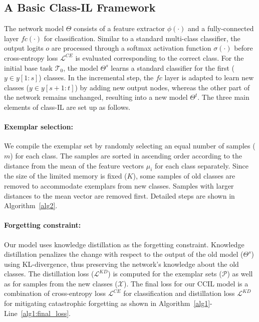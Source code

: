 \documentclass[final]{cvpr}
\begin{document}
\subsection{A Basic Class-IL Framework}
The network model $\Theta$ consists of a feature extractor $\phi(\cdot)$ and a fully-connected layer $fc(\cdot)$ for classification. Similar to a standard multi-class classifier, the output logits $o$ are processed through a softmax activation function $\sigma(\cdot)$ before cross-entropy loss $\mathcal{L}^{CE}$ is evaluated corresponding to the correct class.
For the initial base task $\mathcal{T}_0$, the model $\Theta^s$ learns a standard classifier for the first ($y \in y[1:s]$) classes. 
In the incremental step, the $fc$ layer is adapted to learn new classes ($y \in y[s+1:t]$) by adding new output nodes, whereas the other part of the network remains unchanged, resulting into a new model $\Theta^t$. The three main elements of class-IL are set up as follows. 

\paragraph{Exemplar selection:}
We compile the exemplar set by randomly selecting an equal number of samples ($m$) for each class. The samples are sorted in ascending order according to the distance from the mean of the feature vectors $\mu_i$ for each class separately.
Since the size of the limited memory is fixed ($K$), some samples of old classes are removed to accommodate exemplars from new classes. Samples with larger distances to the mean vector are removed first. Detailed steps are shown in Algorithm~\ref{alg2}.

\paragraph{Forgetting constraint:}
Our model uses knowledge distillation as the forgetting constraint. Knowledge distillation penalizes the change with respect to the output of the old model ($\Theta^s$) using KL-divergence, thus preserving the network's knowledge about the old classes. The distillation loss ($\mathcal{L}^{KD}$) is computed for the exemplar sets ($\mathcal{P}$) as well as for samples from the new classes ($\mathcal{X}$). The final loss for our CCIL model is a combination of cross-entropy loss $\mathcal{L}^{CE}$ for classification and distillation loss $\mathcal{L}^{KD}$ for mitigating catastrophic forgetting as shown in Algorithm~\ref{alg1}-Line~\ref{alg1:final_loss}.
\end{document}
